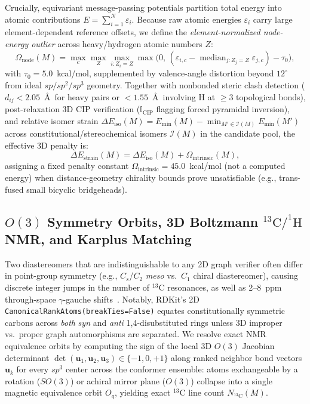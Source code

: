 \documentclass[10pt,twocolumn]{article}
\begin{document}
Crucially, equivariant message-passing potentials partition total energy into atomic contributions $E = \sum_{i=1}^N \varepsilon_i$. Because raw atomic energies $\varepsilon_i$ carry large element-dependent reference offsets, we define the \emph{element-normalized node-energy outlier} across heavy/hydrogen atomic numbers $Z$:
\begin{equation}
  \Omega_{\text{node}}(M) = \max_{c} \max_{Z} \max_{i : Z_i = Z} \max\!\Big(0,\, (\varepsilon_{i,c} - \operatorname{median}_{j : Z_j = Z} \varepsilon_{j,c}) - \tau_0\Big),
  \label{eq:node_outlier}
\end{equation}
with $\tau_0 = 5.0$~kcal/mol, supplemented by valence-angle distortion beyond $12^\circ$ from ideal $sp/sp^2/sp^3$ geometry. Together with nonbonded steric clash detection ($d_{ij} < 2.05$~\AA\ for heavy pairs or $<1.55$~\AA\ involving H at $\ge 3$ topological bonds), post-relaxation 3D CIP verification ($\mathbb{I}_{\text{CIP}}$ flagging forced pyramidal inversion), and relative isomer strain $\Delta E_{\text{iso}}(M) = E_{\min}(M) - \min_{M' \in \mathcal{I}(M)} E_{\min}(M')$ across constitutional/stereochemical isomers $\mathcal{I}(M)$ in the candidate pool, the effective 3D penalty is:
\begin{equation}
  \Delta E_{\text{strain}}(M) = \Delta E_{\text{iso}}(M) + \Omega_{\text{intrinsic}}(M),
\end{equation}
assigning a fixed penalty constant $\Omega_{\text{intrinsic}} = 45.0$~kcal/mol (not a computed energy) when distance-geometry chirality bounds prove unsatisfiable (e.g., trans-fused small bicyclic bridgeheads).

\subsection{$O(3)$ Symmetry Orbits, 3D Boltzmann $^{13}\text{C}/^{1}\text{H}$ NMR, and Karplus Matching}
\label{sec:nmr}

Two diastereomers that are indistinguishable to any 2D graph verifier often differ in point-group symmetry (e.g., $C_s$/$C_2$ \emph{meso} vs.\ $C_1$ chiral diastereomer), causing discrete integer jumps in the number of $^{13}\text{C}$ resonances, as well as 2--8~ppm through-space $\gamma$-gauche shifts~\cite{Dalling1967Cyclohexanes13C,GrantCheney1967,Grutzner1970Norbornyl13C}. Notably, RDKit's 2D \texttt{CanonicalRankAtoms(breakTies=False)} equates constitutionally symmetric carbons across \emph{both} \emph{syn} and \emph{anti} 1,4-disubstituted rings unless 3D improper vs.\ proper graph automorphisms are separated. We resolve exact NMR equivalence orbits by computing the sign of the local 3D $O(3)$ Jacobian determinant $\det(\mathbf{u}_1, \mathbf{u}_2, \mathbf{u}_3) \in \{-1, 0, +1\}$ along ranked neighbor bond vectors $\mathbf{u}_k$ for every $sp^3$ center across the conformer ensemble: atoms exchangeable by a rotation ($SO(3)$) or achiral mirror plane ($O(3)$) collapse into a single magnetic equivalence orbit $O_q$, yielding exact $^{13}\text{C}$ line count $N_{^{13}\text{C}}(M)$.
\end{document}
